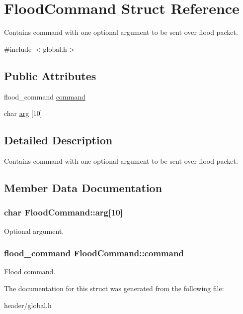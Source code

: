 \hypertarget{structFloodCommand}{\section{Flood\-Command Struct Reference}
\label{structFloodCommand}
}


Contains command with one optional argument to be sent over flood packet.  




{\ttfamily \#include $<$global.\-h$>$}

\subsection*{Public Attributes}
\begin{DoxyCompactItemize}
\item 
flood\-\_\-command \hyperlink{structFloodCommand_a44fa66244aee8f4128e1eba268bd8482}{command}
\item 
char \hyperlink{structFloodCommand_a7403e8113b78e55119f06e4127e8d582}{arg} \mbox{[}10\mbox{]}
\end{DoxyCompactItemize}


\subsection{Detailed Description}
Contains command with one optional argument to be sent over flood packet. 

\subsection{Member Data Documentation}
\hypertarget{structFloodCommand_a7403e8113b78e55119f06e4127e8d582}{
\subsubsection[{arg}]{\setlength{\rightskip}{0pt plus 5cm}char Flood\-Command\-::arg\mbox{[}10\mbox{]}}}\label{structFloodCommand_a7403e8113b78e55119f06e4127e8d582}
Optional argument. \hypertarget{structFloodCommand_a44fa66244aee8f4128e1eba268bd8482}{
\subsubsection[{command}]{\setlength{\rightskip}{0pt plus 5cm}flood\-\_\-command Flood\-Command\-::command}}\label{structFloodCommand_a44fa66244aee8f4128e1eba268bd8482}
Flood command. 

The documentation for this struct was generated from the following file\-:\begin{DoxyCompactItemize}
\item 
header/global.\-h\end{DoxyCompactItemize}
